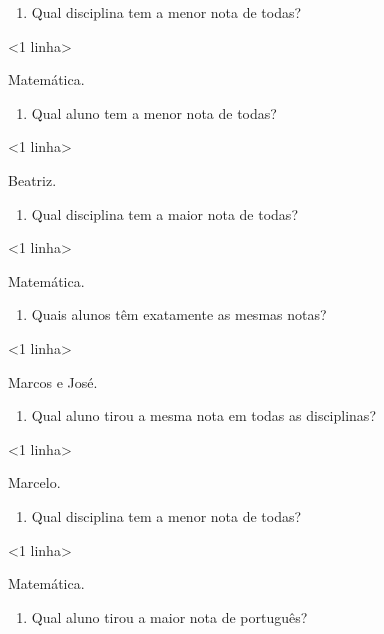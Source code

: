 \begin{enumerate}
\def\labelenumi{\alph{enumi})}
\item
  Qual disciplina tem a menor nota de todas?
\end{enumerate}

\textless{}1 linha\textgreater{}

Matemática.

\begin{enumerate}
\def\labelenumi{\alph{enumi})}
\item
  Qual aluno tem a menor nota de todas?
\end{enumerate}

\textless{}1 linha\textgreater{}

Beatriz.

\begin{enumerate}
\def\labelenumi{\alph{enumi})}
\item
  Qual disciplina tem a maior nota de todas?
\end{enumerate}

\textless{}1 linha\textgreater{}

Matemática.

\begin{enumerate}
\def\labelenumi{\alph{enumi})}
\item
  Quais alunos têm exatamente as mesmas notas?
\end{enumerate}

\textless{}1 linha\textgreater{}

Marcos e José.

\begin{enumerate}
\def\labelenumi{\alph{enumi})}
\item
  Qual aluno tirou a mesma nota em todas as disciplinas?
\end{enumerate}

\textless{}1 linha\textgreater{}

Marcelo.

\begin{enumerate}
\def\labelenumi{\alph{enumi})}
\item
  Qual disciplina tem a menor nota de todas?
\end{enumerate}

\textless{}1 linha\textgreater{}

Matemática.

\begin{enumerate}
\def\labelenumi{\alph{enumi})}
\item
  Qual aluno tirou a maior nota de português?
\end{enumerate}

